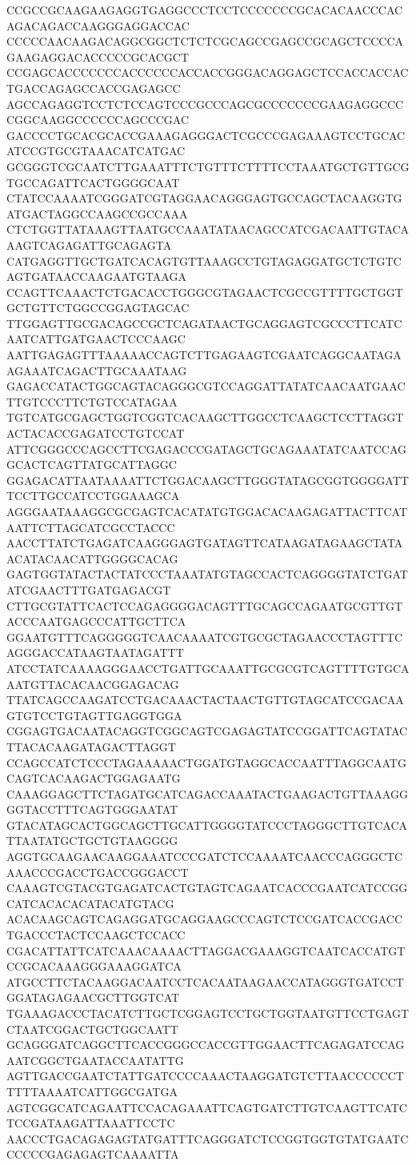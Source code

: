 CCGCCGCAAGAAGAGGTGAGGCCCTCCTCCCCCCCGCACACAACCCACAGACAGACCAAGGGAGGACCAC
CCCCCAACAAGACAGGCGGCTCTCTCGCAGCCGAGCCGCAGCTCCCCAGAAGAGGACACCCCCGCACGCT
CCGAGCACCCCCCCACCCCCCACCACCGGGACAGGAGCTCCACCACCACTGACCAGAGCCACCGAGAGCC
AGCCAGAGGTCCTCTCCAGTCCCGCCCAGCGCCCCCCCGAAGAGGCCCCGGCAAGGCCCCCCAGCCCGAC
GACCCCTGCACGCACCGAAAGAGGGACTCGCCCGAGAAAGTCCTGCACATCCGTGCGTAAACATCATGAC
GCGGGTCGCAATCTTGAAATTTCTGTTTCTTTTCCTAAATGCTGTTGCGTGCCAGATTCACTGGGGCAAT
CTATCCAAAATCGGGATCGTAGGAACAGGGAGTGCCAGCTACAAGGTGATGACTAGGCCAAGCCGCCAAA
CTCTGGTTATAAAGTTAATGCCAAATATAACAGCCATCGACAATTGTACAAAGTCAGAGATTGCAGAGTA
CATGAGGTTGCTGATCACAGTGTTAAAGCCTGTAGAGGATGCTCTGTCAGTGATAACCAAGAATGTAAGA
CCAGTTCAAACTCTGACACCTGGGCGTAGAACTCGCCGTTTTGCTGGTGCTGTTCTGGCCGGAGTAGCAC
TTGGAGTTGCGACAGCCGCTCAGATAACTGCAGGAGTCGCCCTTCATCAATCATTGATGAACTCCCAAGC
AATTGAGAGTTTAAAAACCAGTCTTGAGAAGTCGAATCAGGCAATAGAAGAAATCAGACTTGCAAATAAG
GAGACCATACTGGCAGTACAGGGCGTCCAGGATTATATCAACAATGAACTTGTCCCTTCTGTCCATAGAA
TGTCATGCGAGCTGGTCGGTCACAAGCTTGGCCTCAAGCTCCTTAGGTACTACACCGAGATCCTGTCCAT
ATTCGGGCCCAGCCTTCGAGACCCGATAGCTGCAGAAATATCAATCCAGGCACTCAGTTATGCATTAGGC
GGAGACATTAATAAAATTCTGGACAAGCTTGGGTATAGCGGTGGGGATTTCCTTGCCATCCTGGAAAGCA
AGGGAATAAAGGCGCGAGTCACATATGTGGACACAAGAGATTACTTCATAATTCTTAGCATCGCCTACCC
AACCTTATCTGAGATCAAGGGAGTGATAGTTCATAAGATAGAAGCTATAACATACAACATTGGGGCACAG
GAGTGGTATACTACTATCCCTAAATATGTAGCCACTCAGGGGTATCTGATATCGAACTTTGATGAGACGT
CTTGCGTATTCACTCCAGAGGGGACAGTTTGCAGCCAGAATGCGTTGTACCCAATGAGCCCATTGCTTCA
GGAATGTTTCAGGGGGTCAACAAAATCGTGCGCTAGAACCCTAGTTTCAGGGACCATAAGTAATAGATTT
ATCCTATCAAAAGGGAACCTGATTGCAAATTGCGCGTCAGTTTTGTGCAAATGTTACACAACGGAGACAG
TTATCAGCCAAGATCCTGACAAACTACTAACTGTTGTAGCATCCGACAAGTGTCCTGTAGTTGAGGTGGA
CGGAGTGACAATACAGGTCGGCAGTCGAGAGTATCCGGATTCAGTATACTTACACAAGATAGACTTAGGT
CCAGCCATCTCCCTAGAAAAACTGGATGTAGGCACCAATTTAGGCAATGCAGTCACAAGACTGGAGAATG
CAAAGGAGCTTCTAGATGCATCAGACCAAATACTGAAGACTGTTAAAGGGGTACCTTTCAGTGGGAATAT
GTACATAGCACTGGCAGCTTGCATTGGGGTATCCCTAGGGCTTGTCACATTAATATGCTGCTGTAAGGGG
AGGTGCAAGAACAAGGAAATCCCGATCTCCAAAATCAACCCAGGGCTCAAACCCGACCTGACCGGGACCT
CAAAGTCGTACGTGAGATCACTGTAGTCAGAATCACCCGAATCATCCGGCATCACACACATACATGTACG
ACACAAGCAGTCAGAGGATGCAGGAAGCCCAGTCTCCGATCACCGACCTGACCCTACTCCAAGCTCCACC
CGACATTATTCATCAAACAAAACTTAGGACGAAAGGTCAATCACCATGTCCGCACAAAGGGAAAGGATCA
ATGCCTTCTACAAGGACAATCCTCACAATAAGAACCATAGGGTGATCCTGGATAGAGAACGCTTGGTCAT
TGAAAGACCCTACATCTTGCTCGGAGTCCTGCTGGTAATGTTCCTGAGTCTAATCGGACTGCTGGCAATT
GCAGGGATCAGGCTTCACCGGGCCACCGTTGGAACTTCAGAGATCCAGAATCGGCTGAATACCAATATTG
AGTTGACCGAATCTATTGATCCCCAAACTAAGGATGTCTTAACCCCCCTTTTTAAAATCATTGGCGATGA
AGTCGGCATCAGAATTCCACAGAAATTCAGTGATCTTGTCAAGTTCATCTCCGATAAGATTAAATTCCTC
AACCCTGACAGAGAGTATGATTTCAGGGATCTCCGGTGGTGTATGAATCCCCCCGAGAGAGTCAAAATTA
